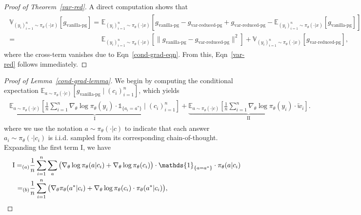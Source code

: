\documentclass{article}
\theoremstyle{definition}
\begin{document}
\begin{appendix}
 \begin{proof}[Proof of Theorem~\ref{var-red}]
A direct computation shows that
\begin{eqnarray}
\begin{split}
\label{var-decomp}
 \mathbb{V}_{(y_i)_{i=1}^n\sim\pi_\theta(\cdot|x)} \left[g_\text{vanilla-pg}\right] =& \mathbb{E}_{(y_i)_{i=1}^n\sim\pi_\theta(\cdot|x)}\left[g_\text{vanilla-pg} - g_\text{var-reduced-pg} + g_\text{var-reduced-pg} - \mathbb{E}_{(y_i)_{i=1}^n\sim\pi_\theta(\cdot|x)}\left[g_\text{vanilla-pg}\right]\right] \\
 =& \mathbb{E}_{(y_i)_{i=1}^n\sim\pi_\theta(\cdot|x)}\left[\|g_\text{vanilla-pg} - g_\text{var-reduced-pg}\|^2\right] +  \mathbb{V}_{(y_i)_{i=1}^n\sim\pi_\theta(\cdot|x)} \left[g_\text{var-reduced-pg}\right],
\end{split}
\end{eqnarray}
where the cross-term vanishes due to Eqn~\eqref{cond-grad-eqn}. From this, Eqn~\eqref{var-red} follows immediately.
\end{proof}
\begin{proof}[Proof of Lemma~\ref{cond-grad-lemma}]
We begin by computing the conditional expectation $\mathbb{E}_{a\sim \pi_\theta(\cdot|c)} \left[g_\text{vanilla-pg} \; | \; (c_i)_{i=1}^n\right]$, which yields
\begin{eqnarray}
\begin{split}
 \underbrace{\mathbb{E}_{a\sim \pi_\theta(\cdot|c)}\left[\frac{1}{n}\sum_{i=1}^n \nabla_\theta\log\pi_\theta(y_i) \cdot \mathds{1}_{\{a_i=a^*\}} \; | \;  (c_i)_{i=1}^n\right]}_{\text{I}} + \underbrace{\mathbb{E}_{a\sim \pi_\theta(\cdot|c)}\left[\frac{1}{n}\sum_{i=1}^n \nabla_\theta\log\pi_\theta(y_i)\cdot \tilde{w}_i\right]}_{\text{II}}.
\end{split}
\end{eqnarray}
where we use the notation $a\sim \pi_\theta(\cdot|c)$ to indicate that each answer $a_i\sim \pi_\theta(\cdot|c_i)$ is i.i.d. sampled from its corresponding chain-of-thought. Expanding the first term $\text{I}$, we have
\begin{eqnarray}
\begin{split}
\label{term-1-expansion}
\text{I} =_{(a)}& \frac{1}{n}\sum_{i=1}^n\sum_a\big{(}\nabla_\theta\log\pi_\theta(a | c_i) + \nabla_\theta\log\pi_\theta(c_i)\big{)} \cdot \mathds{1}_{\{a=a^*\}}\cdot \pi_\theta(a|c_i)\\
=_{(b)}& \frac{1}{n}\sum_{i=1}^n \big{(}\nabla_\theta\pi_\theta(a^* | c_i) + \nabla_\theta\log\pi_\theta(c_i)\cdot\pi_\theta(a^*|c_i) \big{)},

\end{split}
\end{eqnarray}
\end{proof}
\end{appendix}
\end{document}
